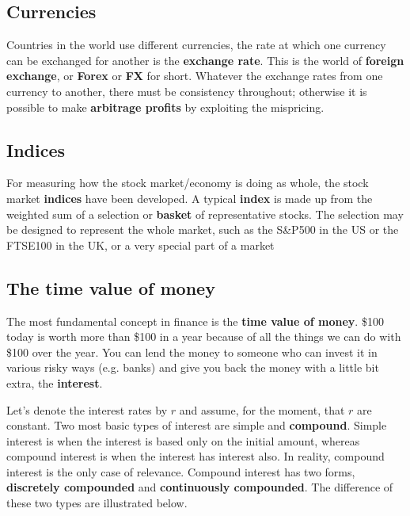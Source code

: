 \subsection{Currencies}
Countries in the world use different currencies, the rate at which one currency can be exchanged for another is the \textbf{exchange rate}. This is the world of \textbf{foreign exchange}, or \textbf{Forex} or \textbf{FX} for short. Whatever the exchange rates from one currency to another, there must be consistency throughout; otherwise it is possible to make \textbf{arbitrage profits} by exploiting the mispricing.


\subsection{Indices}
For measuring how the stock market/economy is doing as whole, the stock market \textbf{indices} have been developed. A typical \textbf{index} is made up from the weighted sum of a selection or \textbf{basket} of representative stocks. The selection may be designed to represent the whole market, such as the S\&P500 in the US or the FTSE100 in the UK, or a very special part of a market


\subsection{The time value of money}
The most fundamental concept in finance is the \textbf{time value of money}. \$100 today is worth more than \$100 in a year because of all the things we can do with \$100 over the year. You can lend the money to someone who can invest it in various risky ways (e.g. banks) and give you back the money with a little bit extra, the \textbf{interest}.

Let's denote the interest rates by $r$ and assume, for the moment, that $r$ are constant. Two most basic types of interest are simple and \textbf{compound}. Simple interest is when the interest is based only on the initial amount, whereas compound interest is when the interest has interest also. In reality, compound interest is the only case of relevance. Compound interest has two forms, \textbf{discretely compounded} and \textbf{continuously compounded}. The difference of these two types are illustrated below. 


